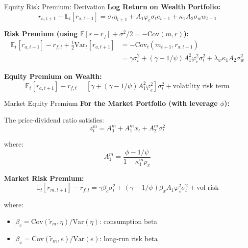 \documentclass{beamer}
\newcommand{\E}{\mathbb{E}}
\newcommand{\Var}{\mathrm{Var}}
\newcommand{\Cov}{\mathrm{Cov}}
\newcommand{\tld}[1]{\widetilde{#1}}
\begin{document}
\begin{frame}{Equity Risk Premium: Derivation}
    \textbf{Log Return on Wealth Portfolio:}
    \begin{equation}
        r_{a,t+1} - \E_t[r_{a,t+1}] = \sigma_t \eta_{t+1} + A_1 \varphi_e \sigma_t e_{t+1} + \kappa_1 A_2 \sigma_w w_{t+1}
    \end{equation}
    
    \textbf{Risk Premium (using $\E[r - r_f] + \sigma^2/2 = -\Cov(m, r)$):}
    \begin{align}
        \E_t[r_{a,t+1}] - r_{f,t} + \frac{1}{2}\Var_t[r_{a,t+1}] &= -\Cov_t(m_{t+1}, r_{a,t+1}) \nonumber \\
        &= \gamma \sigma_t^2 + (\gamma - 1/\psi) A_1^2 \varphi_e^2 \sigma_t^2 + \lambda_w \kappa_1 A_2 \sigma_w^2
    \end{align}
    
    \textbf{Equity Premium on Wealth:}
    \begin{equation}
        \boxed{\E_t[r_{a,t+1}] - r_{f,t} = \left[\gamma + (\gamma - 1/\psi)A_1^2\varphi_e^2\right]\sigma_t^2 + \text{volatility risk term}}
    \end{equation}
\end{frame}

\begin{frame}{Market Equity Premium}
    \textbf{For the Market Portfolio (with leverage $\phi$):}
    
    The price-dividend ratio satisfies:
    \begin{equation}
        z_t^m = A_0^m + A_1^m x_t + A_2^m \sigma_t^2
    \end{equation}
    
    where:
    \begin{equation}
        A_1^m = \frac{\phi - 1/\psi}{1 - \kappa_1^m \rho_x}
    \end{equation}
    
    \textbf{Market Risk Premium:}
    \begin{equation}
        \boxed{\E_t[r_{m,t+1}] - r_{f,t} = \gamma \beta_c \sigma_t^2 + (\gamma - 1/\psi) \beta_x A_1 \varphi_e^2 \sigma_t^2 + \text{vol risk}}
    \end{equation}
    
    where:
    \begin{itemize}
        \item $\beta_c = \Cov(\tld{r}_m, \eta)/\Var(\eta)$: consumption beta
        \item $\beta_x = \Cov(\tld{r}_m, e)/\Var(e)$: long-run risk beta
    \end{itemize}
\end{frame}
\end{document}
